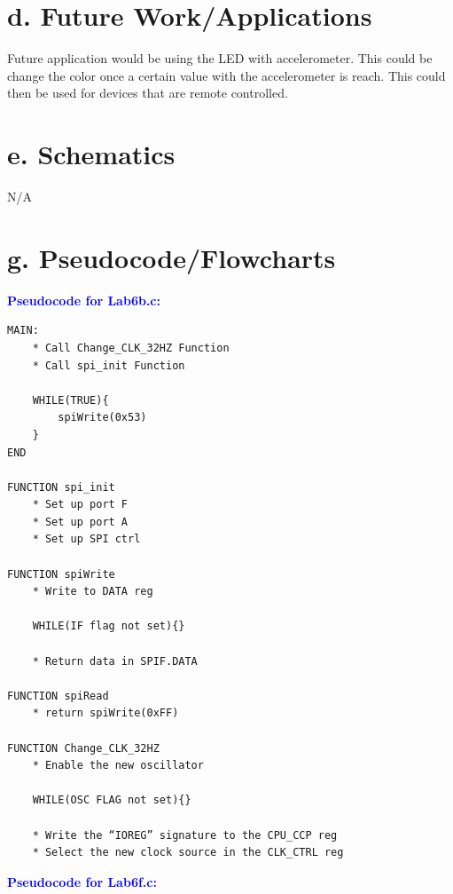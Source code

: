 \documentclass[11pt]{article}
\theoremstyle{plain}
\theoremstyle{definition}
\begin{document}
\section*{d. Future Work/Applications}
Future application would be using the LED with accelerometer. This could be change the color once a certain value with the accelerometer is reach. This could then be used for devices that are remote controlled.  
%
%
\section*{e. Schematics}
N/A
%
%
\newpage
\section*{g. Pseudocode/Flowcharts}
%
%
\textbf{\textcolor{blue}{Pseudocode for Lab6b.c:}}
\begin{tcolorbox}
\begin{verbatim}
MAIN:
    * Call Change_CLK_32HZ Function
    * Call spi_init Function
    
    WHILE(TRUE){
        spiWrite(0x53)
    } 
END  

FUNCTION spi_init 
    * Set up port F
    * Set up port A
    * Set up SPI ctrl
    
FUNCTION spiWrite
    * Write to DATA reg
    
    WHILE(IF flag not set){}
    
    * Return data in SPIF.DATA
    
FUNCTION spiRead
    * return spiWrite(0xFF)
        
FUNCTION Change_CLK_32HZ
    * Enable the new oscillator

    WHILE(OSC FLAG not set){}

    * Write the “IOREG” signature to the CPU_CCP reg
    * Select the new clock source in the CLK_CTRL reg  
\end{verbatim}
\end{tcolorbox}
%
%
\newpage
\textbf{\textcolor{blue}{Pseudocode for Lab6f.c:}}
\end{document}
